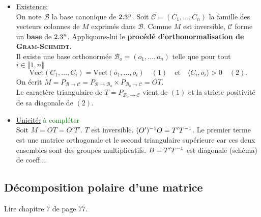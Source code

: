 \begin{preuve}
    \begin{itemize}
        \item \underline{Existence:} \\
        On note $\mathscr{B}$ la base canonique de $2.3^n$. Soit $\mathscr{C} = (C_1, \dots, C_n)$ la famille des vecteurs colonnes de $M$ exprimés dans $\mathscr{B}$. Comme $M$ est inversible, $\mathscr{C}$ forme un \textbf{base} de $2.3^n$. Appliquons-lui le \textbf{procédé d'orthonormalisation de \textsc{Gram}-\textsc{Schmidt}}. \\
        Il existe une base orthonormée $\mathscr{B}_o = (o_1, \dots, o_n)$ telle que pour tout $i \in \llbracket 1, n \rrbracket$
        $$\mathrm{Vect}(C_1, \dots, C_i) = \mathrm{Vect}(o_1,\dots, o_i) \quad (1) \quad \text{et} \quad \langle C_i, o_i \rangle > 0 \quad (2).$$
        On écrit $M = P_{\mathscr{B} \to \mathscr{C}} = P_{\mathscr{B} \to \mathscr{B}_o} \times P_{\mathscr{B}_o \to \mathscr{C}} = OT$. \\
        Le caractère triangulaire de $T = P_{\mathscr{B}_o \to \mathscr{C}}$ vient de $(1)$ et la stricte positivité de sa diagonale de $(2)$.
        \item \underline{Unicité:} \textcolor{green}{à compléter} \\
        Soit $M = OT = O'T'$. $T$ est inversible. $(O')^{-1}O =T'T^{-1}$. Le premier terme est une matrice orthogonale et le second triangulaire supérieure car ces deux ensembles sont des groupes multiplicatifs. $B = T'T^{-1}$ est diagonale (schéma) de coeff...
    \end{itemize} 
\end{preuve}

\subsection{Décomposition polaire d'une matrice}
Lire chapitre 7 de \cite{matrices} page 77.